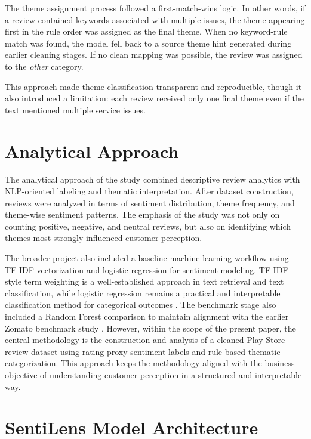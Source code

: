 The theme assignment process followed a first-match-wins logic. In other words, if a review contained keywords associated with multiple issues, the theme appearing first in the rule order was assigned as the final theme. When no keyword-rule match was found, the model fell back to a source theme hint generated during earlier cleaning stages. If no clean mapping was possible, the review was assigned to the \textit{other} category.

This approach made theme classification transparent and reproducible, though it also introduced a limitation: each review received only one final theme even if the text mentioned multiple service issues.

\section{Analytical Approach}

The analytical approach of the study combined descriptive review analytics with NLP-oriented labeling and thematic interpretation. After dataset construction, reviews were analyzed in terms of sentiment distribution, theme frequency, and theme-wise sentiment patterns. The emphasis of the study was not only on counting positive, negative, and neutral reviews, but also on identifying which themes most strongly influenced customer perception.

The broader project also included a baseline machine learning workflow using TF-IDF vectorization and logistic regression for sentiment modeling. TF-IDF style term weighting is a well-established approach in text retrieval and text classification, while logistic regression remains a practical and interpretable classification method for categorical outcomes \cite{salton1988,hosmer2013}. The benchmark stage also included a Random Forest comparison to maintain alignment with the earlier Zomato benchmark study \cite{breiman2001,jonathan2019}. However, within the scope of the present paper, the central methodology is the construction and analysis of a cleaned Play Store review dataset using rating-proxy sentiment labels and rule-based thematic categorization. This approach keeps the methodology aligned with the business objective of understanding customer perception in a structured and interpretable way.

\section{SentiLens Model Architecture}

